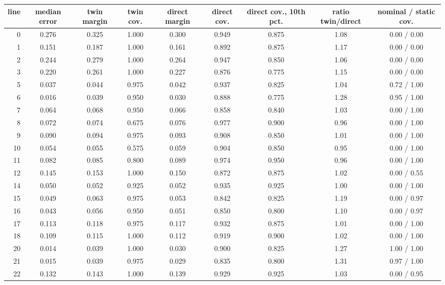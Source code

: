 \begin{longtable}{rcccccccc}
\toprule
line & median error & twin margin & twin cov. & direct margin & direct cov. & direct cov., 10th pct. & ratio twin/direct & nominal / static cov.\\
\midrule
\endhead
0 & 0.276 & 0.325 & 1.000 & 0.300 & 0.949 & 0.875 & 1.08 & 0.00 / 0.00\\
1 & 0.151 & 0.187 & 1.000 & 0.161 & 0.892 & 0.875 & 1.17 & 0.00 / 0.00\\
2 & 0.244 & 0.279 & 1.000 & 0.264 & 0.947 & 0.850 & 1.06 & 0.00 / 0.00\\
3 & 0.220 & 0.261 & 1.000 & 0.227 & 0.876 & 0.775 & 1.15 & 0.00 / 0.00\\
5 & 0.037 & 0.044 & 0.975 & 0.042 & 0.937 & 0.825 & 1.04 & 0.72 / 1.00\\
6 & 0.016 & 0.039 & 0.950 & 0.030 & 0.888 & 0.775 & 1.28 & 0.95 / 1.00\\
7 & 0.064 & 0.068 & 0.950 & 0.066 & 0.858 & 0.840 & 1.03 & 0.00 / 1.00\\
8 & 0.072 & 0.074 & 0.675 & 0.076 & 0.977 & 0.900 & 0.96 & 0.00 / 1.00\\
9 & 0.090 & 0.094 & 0.975 & 0.093 & 0.908 & 0.850 & 1.01 & 0.00 / 1.00\\
10 & 0.054 & 0.055 & 0.575 & 0.059 & 0.904 & 0.850 & 0.95 & 0.00 / 1.00\\
11 & 0.082 & 0.085 & 0.800 & 0.089 & 0.974 & 0.950 & 0.96 & 0.00 / 1.00\\
12 & 0.145 & 0.153 & 1.000 & 0.150 & 0.872 & 0.875 & 1.02 & 0.00 / 0.55\\
14 & 0.050 & 0.052 & 0.925 & 0.052 & 0.935 & 0.925 & 1.00 & 0.00 / 1.00\\
15 & 0.049 & 0.063 & 0.975 & 0.053 & 0.842 & 0.825 & 1.19 & 0.00 / 0.97\\
16 & 0.043 & 0.056 & 0.950 & 0.051 & 0.850 & 0.800 & 1.10 & 0.00 / 0.97\\
17 & 0.113 & 0.118 & 0.975 & 0.117 & 0.932 & 0.875 & 1.01 & 0.00 / 1.00\\
18 & 0.109 & 0.115 & 1.000 & 0.112 & 0.919 & 0.900 & 1.02 & 0.00 / 1.00\\
20 & 0.014 & 0.039 & 1.000 & 0.030 & 0.900 & 0.825 & 1.27 & 1.00 / 1.00\\
21 & 0.015 & 0.039 & 0.975 & 0.029 & 0.835 & 0.800 & 1.31 & 0.97 / 1.00\\
22 & 0.132 & 0.143 & 1.000 & 0.139 & 0.929 & 0.925 & 1.03 & 0.00 / 0.95\\

\end{longtable}
